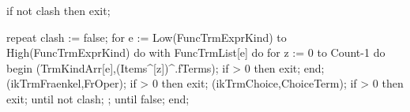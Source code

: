       if not clash then exit;
      
      repeat
         clash := false;
         for e := Low(FuncTrmExprKind) to High(FuncTrmExprKind) do
            with FuncTrmList[e] do
               for z := 0 to Count-1 do
               begin
                  (TrmKindArr[e],(Items^[z])^.fTerms);
                  if  > 0 then exit;
               end;
         (ikTrmFraenkel,FrOper);
         if  > 0 then exit;
         (ikTrmChoice,ChoiceTerm);
         if  > 0 then exit;
      until not clash;
      ;
   until false;
end;
\eatline
